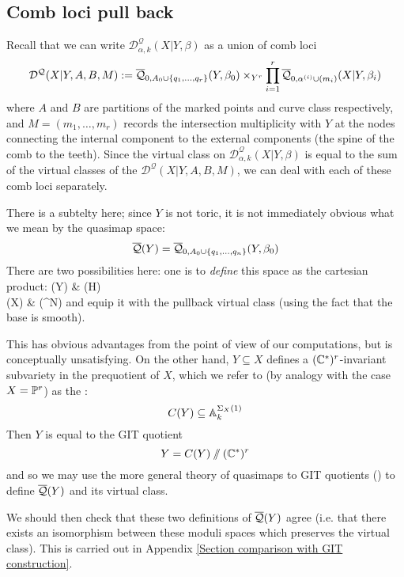 \subsection{Comb loci pull back}
Recall that we can write $\mathcal D^\mathcal{Q}_{\alpha,k}(X|Y,\beta)$ as a union of comb loci
\begin{equation*} \mathcal D^{\mathcal{Q}}(X|Y,A,B,M) := \overline{\mathcal Q}_{0,A_0 \cup \{q_1, \ldots, q_r\}}(Y,\beta_0) \times_{Y^r} \prod_{i=1}^r \overline{\mathcal Q}_{0,\alpha^{(i)}\cup (m_i)}(X|Y,\beta_i) \end{equation*}
where $A$ and $B$ are partitions of the marked points and curve class respectively, and $M=(m_1,\ldots,m_r)$ records the intersection multiplicity with $Y$ at the nodes connecting the internal component to the external components (the spine of the comb to the teeth). Since the virtual class on $\mathcal D^\mathcal{Q}_{\alpha,k}(X|Y,\beta)$ is equal to the sum of the virtual classes of the $\mathcal D^{\mathcal{Q}}(X|Y,A,B,M)$, we can deal with each of these comb loci separately.


\begin{remark} \label{GIT comparison remark} There is a subtelty here; since $Y$ is not toric, it is not immediately obvious what we mean by the quasimap space:
\begin{equation*} \overline{\mathcal{Q}}(Y) = \overline{\mathcal Q}_{0,A_0 \cup \{ q_1, \ldots, q_n \}}(Y,\beta_0) \end{equation*}
There are two possibilities here: one is to \emph{define} this space as the cartesian product:
\bcd
{}(Y) \ar[r] \ar[d]  & (H) \ar[d] \\
(X) \ar[r] & (\PP^N)
\ecd
and equip it with the pullback virtual class (using the fact that the base is smooth).

This has obvious advantages from the point of view of our computations, but is conceptually unsatisfying. On the other hand, $Y \subseteq X$ defines a $(\mathbb{C}^*)^r$-invariant subvariety in the prequotient of $X$, which we refer to (by analogy with the case $X=\mathbb P^r$) as the :
\begin{equation*} C(Y) \subseteq \mathbb{A}_k^{\Sigma_X(1)} \end{equation*}
Then $Y$ is equal to the GIT quotient
\begin{equation*} Y = C(Y) \sslash (\mathbb{C}^*)^r \end{equation*}
and so we may use the more general theory of quasimaps to GIT quotients (\cite{CFKM}) to define $\overline{\mathcal{Q}}(Y)$ and its virtual class.

We should then check that these two definitions of $\overline{\mathcal{Q}}(Y)$ agree (i.e. that there exists an isomorphism between these moduli spaces which preserves the virtual class). This is carried out in Appendix \ref{Section comparison with GIT construction}.
\end{remark}

